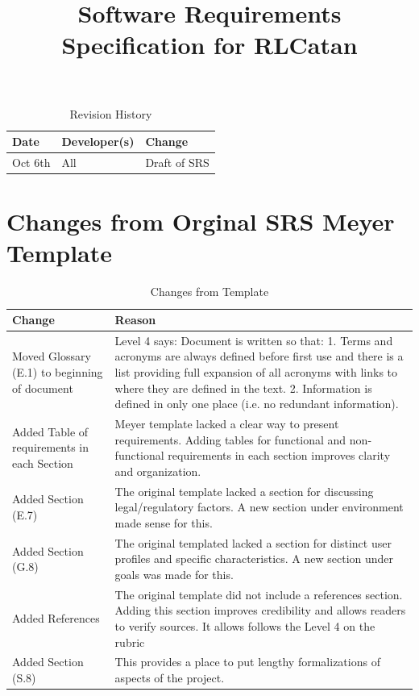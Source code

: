 \documentclass{article}
\title{Software Requirements Specification for RLCatan\\\progname}
\author{\authname}
\date{}
\begin{document}
\maketitle

\tableofcontents

\listoftables

\listoffigures

\newpage

\begin{table}[hp]
\caption{Revision History} \label{TblRevisionHistory}
\begin{tabularx}{\textwidth}{llX}
\toprule
\textbf{Date} & \textbf{Developer(s)} & \textbf{Change}\\
\midrule
Oct 6th & All & Draft of SRS\\
\bottomrule
\end{tabularx}
\end{table}

\section*{Changes from Orginal SRS Meyer Template}
\begin{table}[H]
\caption{Changes from Template} \label{ChangesFromTemplate}
\begin{tabularx}{\textwidth}{|p{4cm}|>{\raggedright\arraybackslash}X|}
\hline
\textbf{Change} & \textbf{Reason} \\
\hline
Moved Glossary (E.1) to beginning of document & Level 4 says: Document is written so that: 1. Terms and acronyms are always defined before first use and there is a list providing full expansion of all acronyms with links to where they are defined in the text. 2. Information is defined in only one place (i.e. no redundant information). \\
\hline
Added Table of requirements in each Section & Meyer template lacked a clear way to present requirements. Adding tables for functional and non-functional requirements in each section improves clarity and organization. \\
\hline
Added Section (E.7) & The original template lacked a section for discussing legal/regulatory factors. A new section under environment made sense for this. \\
\hline
Added Section (G.8) & The original templated lacked a section for distinct user profiles and specific characteristics. A new section under goals was made for this.\\
\hline
Added References & The original template did not include a references section. Adding this section improves credibility and allows readers to verify sources. It allows follows the Level 4 on the rubric \\
\hline
Added Section (S.8) & This provides a place to put lengthy formalizations of aspects of the project. \\
\hline
\end{tabularx}
\end{table}
\end{document}
